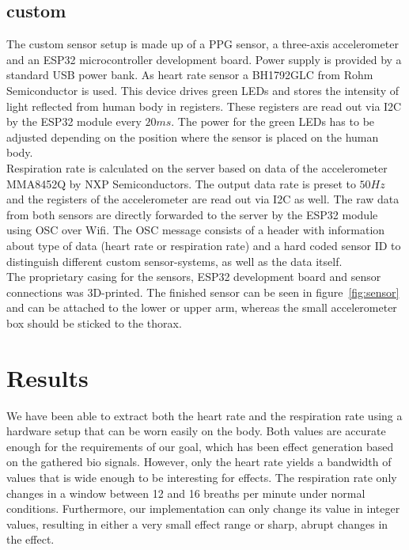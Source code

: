 \documentclass{sigchi-ext}
\begin{document}
\subsection{custom}
The custom sensor setup is made up of a PPG sensor, a three-axis accelerometer and an ESP32 microcontroller development board.
Power supply is provided by a standard USB power bank. As heart rate sensor a BH1792GLC from Rohm Semiconductor is used.
This device drives green LEDs and stores the intensity of light reflected from human body in registers\cite{heartratesensor}.
These registers are read out via I2C by the ESP32 module every $20ms$. The power for the green LEDs has to
be adjusted depending on the position where the sensor is placed on the human body. \\
Respiration rate is calculated on the server based on data of the accelerometer MMA8452Q by NXP Semiconductors.
The output data rate is preset to $50Hz$ and the registers of the accelerometer are read out via I2C as well.
The raw data from both sensors are directly forwarded to the server by the ESP32 module using OSC over Wifi. The OSC message
consists of a header with information about type of data (heart rate or respiration rate) and a hard coded sensor ID to distinguish
different custom sensor-systems, as well as the data itself. \\
The proprietary casing for the sensors, ESP32 development board and sensor connections was 3D-printed. The finished sensor can be
seen in figure~\ref{fig:sensor} and can be attached to the lower or upper arm, whereas the small accelerometer box should be 
sticked to the thorax.
 
\section{Results}

We have been able to extract both the heart rate and the respiration rate using a hardware setup that can be
worn easily on the body. Both values are accurate enough for the requirements of our goal, which has been
effect generation based on the gathered bio signals. However, only the heart rate yields a bandwidth of values
that is wide enough to be interesting for effects. The respiration rate only changes in a window between 12 and 16 breaths per 
minute under normal conditions. Furthermore, our implementation can only change its value in integer values, resulting in either a 
very small effect range or sharp, abrupt changes in the effect.
\end{document}
